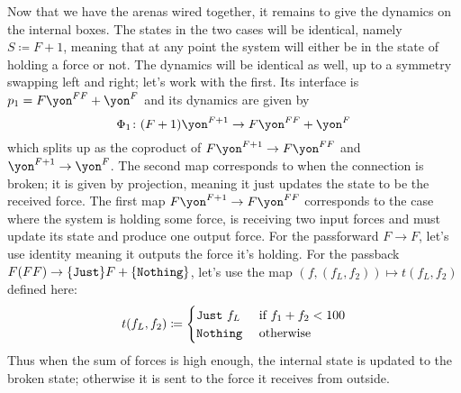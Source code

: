 \documentclass[DynamicalBook]{subfiles}
\begin{document}
\begin{example}
Now that we have the arenas wired together, it remains to give the dynamics on the internal boxes. The states in the two cases will be identical, namely $S\coloneqq F+1$, meaning that at any point the system will either be in the state of holding a force or not. The dynamics will be identical as well, up to a symmetry swapping left and right; let's work with the first. Its interface is $p_1=F\yon^{FF}+\yon^F$ and its dynamics are given by
\[\Phi_1\colon (F+1)\yon^{F+1}\to F\yon^{FF}+\yon^F\]
which splits up as the coproduct of $F\yon^{F+1}\to F\yon^{FF}$ and $\yon^{F+1}\to\yon^F$. The second map corresponds to when the connection is broken; it is given by projection, meaning it just updates the state to be the received force. The first map  $F\yon^{F+1}\to F\yon^{FF}$ corresponds to the case where the system is holding some force, is receiving two input forces and must update its state and produce one output force. For the passforward $F\to F$, let's use identity meaning it outputs the force it's holding. For the passback $F(FF)\to \{\mathtt{Just}\}F+\{\mathtt{Nothing}\}$, let's use the map $(f,(f_L,f_2))\mapsto t(f_L,f_2)$ defined here:
\[
t(f_L,f_2)\coloneqq
\begin{cases}
	\mathtt{Just}~f_L&\textnormal{ if }f_1+f_2<100\\
	\mathtt{Nothing}&\textnormal{ otherwise}
\end{cases}
\]
Thus when the sum of forces is high enough, the internal state is updated to the broken state; otherwise it is sent to the force it receives from outside.
\end{example}
\end{document}
